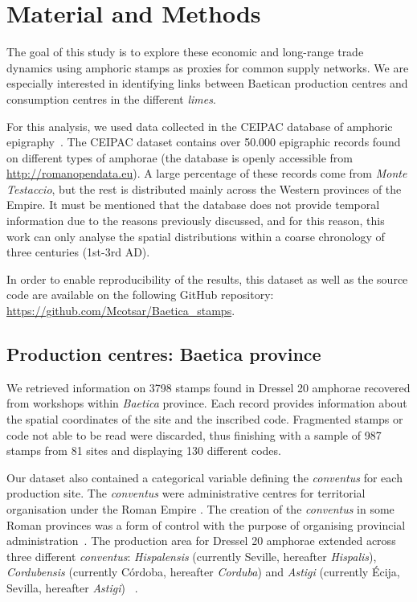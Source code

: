 \section{Material and Methods}
\label{sec:5}

The goal of this study is to explore these economic and long-range trade dynamics using amphoric stamps as proxies for common supply networks. We are especially interested in identifying links between Baetican production centres and consumption centres in the different \textit{limes}. 

For this analysis, we used data collected in the CEIPAC database of amphoric epigraphy~\citep{remesal_centro_2015}. The CEIPAC dataset contains over 50.000 epigraphic records found on different types of amphorae (the database is openly accessible from \url{http://romanopendata.eu}). A large percentage of these records come from \textit{Monte Testaccio}, but the rest is distributed mainly across the Western provinces of the Empire. It must be mentioned that the database does not provide temporal information due to the reasons previously discussed, and for this reason, this work can only analyse the spatial distributions within a coarse chronology of three centuries (1st-3rd AD).

In order to enable reproducibility of the results, this dataset as well as the source code are available on the following GitHub repository: \url{https://github.com/Mcotsar/Baetica\_stamps}.

\subsection{Production centres: Baetica province}
\label{sec:5}

We retrieved information on 3798 stamps found in Dressel 20 amphorae recovered from workshops within \textit{Baetica} province. Each record provides information about the spatial coordinates of the site and the inscribed code. Fragmented stamps or code not able to be read were discarded, thus finishing with a sample of 987 stamps from 81 sites and displaying 130 different codes. 

Our dataset also contained a categorical variable defining the \textit{conventus} for each production site. The \textit{conventus} were administrative centres for territorial organisation under the Roman Empire \citep[58]{ozcariz_gil_administracion_2013}. The creation of the \textit{conventus} in some Roman provinces was a form of control with the purpose of organising provincial administration~\citep{albertini_les_1923}. The production area for Dressel 20 amphorae extended across three different \textit{conventus}: \textit{Hispalensis} (currently Seville, hereafter \textit{Hispalis}), \textit{Cordubensis} (currently C\'ordoba, hereafter \textit{Corduba}) and \textit{Astigi} (currently \'Ecija, Sevilla, hereafter \textit{Astigi})~\citep{rodriguez_economioleicola_1977,chicdatos2001,berni_millet_epigrafianforica_2008} . 

